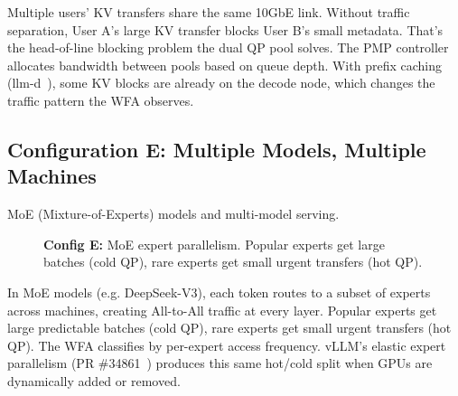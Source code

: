 \documentclass[11pt]{article}
\begin{document}
Multiple users' KV transfers share the same 10GbE link. Without traffic separation, User A's large KV transfer blocks User B's small metadata. That's the head-of-line blocking problem the dual QP pool solves. The PMP controller allocates bandwidth between pools based on queue depth. With prefix caching (llm-d~\cite{llmd_v05}), some KV blocks are already on the decode node, which changes the traffic pattern the WFA observes.

\subsection{Configuration E: Multiple Models, Multiple Machines}

MoE (Mixture-of-Experts) models and multi-model serving.

\begin{figure}[ht]
\centering
{}
\caption{\textbf{Config E:} MoE expert parallelism. Popular experts get large batches (cold QP), rare experts get small urgent transfers (hot QP).}
\end{figure}

In MoE models (e.g. DeepSeek-V3), each token routes to a subset of experts across machines, creating All-to-All traffic at every layer. Popular experts get large predictable batches (cold QP), rare experts get small urgent transfers (hot QP). The WFA classifies by per-expert access frequency. vLLM's elastic expert parallelism (PR \#34861~\cite{vllm_pr34861}) produces this same hot/cold split when GPUs are dynamically added or removed.
\end{document}
